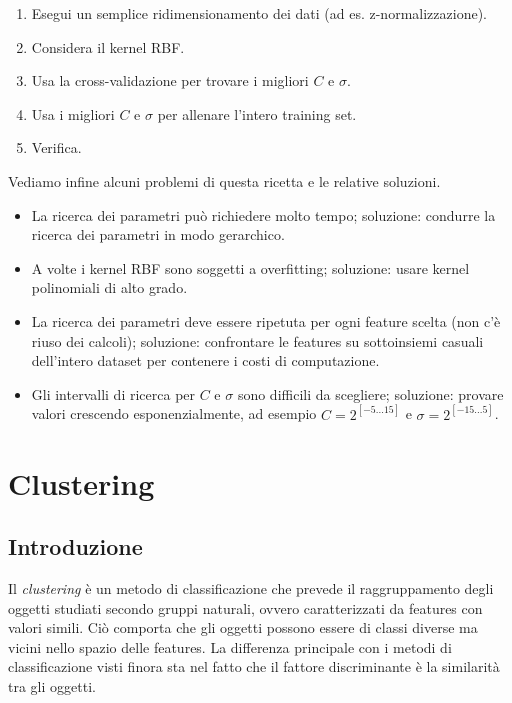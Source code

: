 \documentclass[a4paper,oneside,titlepage]{book}
\begin{document}
\begin{enumerate}
    \item Esegui un semplice ridimensionamento dei dati (ad es. z-normalizzazione).
    \item Considera il kernel RBF.
    \item Usa la cross-validazione per trovare i migliori $C$ e $\sigma$.
    \item Usa i migliori $C$ e $\sigma$ per allenare l'intero training set.
    \item Verifica. 
\end{enumerate}
Vediamo infine alcuni problemi di questa ricetta e le relative soluzioni.
\begin{itemize}
    \item La ricerca dei parametri può richiedere molto tempo; soluzione: condurre la ricerca dei parametri in modo gerarchico.
    \item A volte i kernel RBF sono soggetti a overfitting; soluzione: usare kernel polinomiali di alto grado.
    \item La ricerca dei parametri deve essere ripetuta per ogni feature scelta (non c'è riuso dei calcoli); soluzione: confrontare le features su sottoinsiemi casuali dell'intero dataset per contenere i costi di computazione.
    \item Gli intervalli di ricerca per $C$ e $\sigma$ sono difficili da scegliere; soluzione: provare valori crescendo esponenzialmente, ad esempio $C=2^{[-5...15]}$ e $\sigma=2^{[-15...5]}$.
\end{itemize}


\chapter{Clustering}

\section{Introduzione}
Il \textit{clustering} è un metodo di classificazione che prevede il raggruppamento degli oggetti studiati secondo gruppi naturali, ovvero caratterizzati da features con valori simili. Ciò comporta che gli oggetti possono essere di classi diverse ma vicini nello spazio delle features. La differenza principale con i metodi di classificazione visti finora sta nel fatto che il fattore discriminante è la similarità tra gli oggetti.
\end{document}

